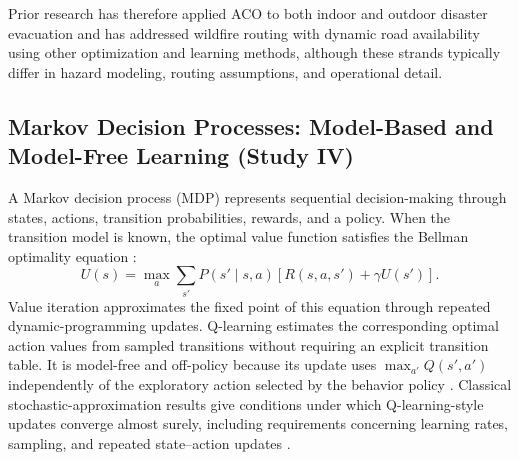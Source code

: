 \documentclass{ai-lab-report}
\begin{document}
Prior research has therefore applied ACO to both indoor and outdoor disaster evacuation and has addressed wildfire routing with dynamic road availability using other optimization and learning methods, although these strands typically differ in hazard modeling, routing assumptions, and operational detail.

\subsection{Markov Decision Processes: Model-Based and Model-Free Learning (Study IV)}

A Markov decision process (MDP) represents sequential decision-making through states, actions, transition probabilities, rewards, and a policy. When the transition model is known, the optimal value function satisfies the Bellman optimality equation \citep{russell2021ai}:
\begin{equation}
U(s)
=
\max_a
\sum_{s'}
P(s' \mid s,a)
\left[
R(s,a,s')+\gamma U(s')
\right].
\label{eq:bellman}
\end{equation}
Value iteration approximates the fixed point of this equation through repeated dynamic-programming updates. Q-learning estimates the corresponding optimal action values from sampled transitions without requiring an explicit transition table. It is model-free and off-policy because its update uses
$\max_{a'}Q(s',a')$ independently of the exploratory action selected by the behavior policy \citep{watkins1992qlearning,sutton2018rl}. Classical stochastic-approximation results give conditions under which Q-learning-style updates converge almost surely, including requirements concerning learning rates, sampling, and repeated state--action updates \citep{jaakkola1994convergence}.
\end{document}
